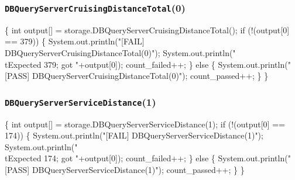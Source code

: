\documentclass{article}
\def\nwendcode{\endtrivlist \endgroup}
\let\nwdocspar=\par
\begin{document}
\subsubsection{{\tt{}DBQueryServerCruisingDistanceTotal}(0)}
\nwenddocs{}\endmoddef{}
\{
  int output[] = storage.DBQueryServerCruisingDistanceTotal();
  if (!(output[0] == 379)) \{
    System.out.println("[FAIL] DBQueryServerCruisingDistanceTotal(0)");
    System.out.println("\\tExpected 379; got "+output[0]);
    count_failed++;
  \} else \{
    System.out.println("[PASS] DBQueryServerCruisingDistanceTotal(0)");
    count_passed++;
  \}
\}
\nwendcode{}\nwdocspar
\subsubsection{{\tt{}DBQueryServerServiceDistance}(1)}
\nwenddocs{}\endmoddef{}
\{
  int output[] = storage.DBQueryServerServiceDistance(1);
  if (!(output[0] == 174)) \{
    System.out.println("[FAIL] DBQueryServerServiceDistance(1)");
    System.out.println("\\tExpected 174; got "+output[0]);
    count_failed++;
  \} else \{
    System.out.println("[PASS] DBQueryServerServiceDistance(1)");
    count_passed++;
  \}
\}
\nwendcode{}\nwdocspar
\end{document}
